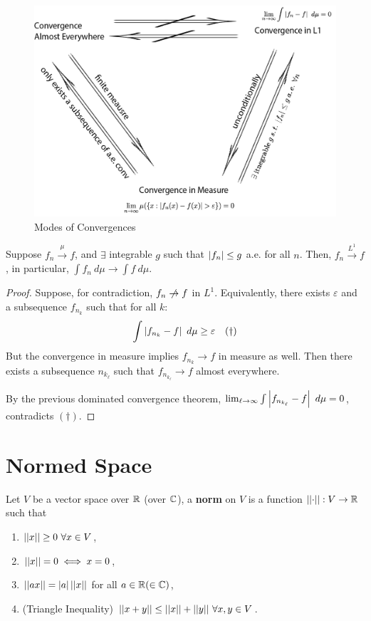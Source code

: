 \documentclass[11pt]{article}
\begin{document}
	\begin{figure}[H]
		\caption{Modes of Convergences}
		\medbreak
		\centering
		\includegraphics[width=0.7\linewidth]{mode_of_convergence.png}
	\end{figure}
	
	\begin{proposition}
		Suppose $f_n \overset{\mu}{\to} f$, and $\exists$ integrable $g$ such that $\left \vert {f_n} \right \vert \leq g$ a.e. for all $n$. Then, $f_n \overset{L^1}{\to} f$, in particular, $\int f_n\ d\mu \to \int f\ d\mu$.
		\begin{proof}
			Suppose, for contradiction, $f_n \centernot \to f$ in $L^1$. Equivalently, there exists $\varepsilon$ and a subsequence $f_{n_k}$ such that for all $k$:
			\begin{align}
				\int \left \vert {f_{n_k} - f} \right \vert\ d\mu \geq \varepsilon \quad (\dagger)
			\end{align}
			But the convergence in measure implies $f_{n_k} \to f$ in measure as well. Then there exists a subsequence $n_{k_\ell}$ such that $f_{n_{k_\ell}} \to f$ almost everywhere.
			
			By the previous dominated convergence theorem, $\lim_{\ell \to \infty} \int \left \vert {f_{n_{k_\ell}} - f} \right \vert\ d\mu = 0$, contradicts $(\dagger)$.
		\end{proof}
	\end{proposition}
	
	\section{Normed Space}
	\begin{definition}
		Let $V$ be a vector space over $\mathbb{R}$ (over $\mathbb{C}$), a \textbf{norm} on $V$ is a function $\vert \vert {\cdot} \vert \vert: V \to \mathbb{R}$ such that
		\begin{enumerate}
			\item $\vert \vert {x} \vert \vert \geq 0\ \forall x \in V$,
			\item $\vert \vert {x} \vert \vert = 0 \iff x = 0$,
			\item $\vert \vert {a x} \vert \vert = \left \vert {a} \right \vert \vert \vert {x} \vert \vert$ for all $a \in \mathbb{R}(\in \mathbb{C})$,
			\item (Triangle Inequality) $\vert \vert {x + y} \vert \vert \leq \vert \vert {x} \vert \vert + \vert \vert {y} \vert \vert\ \forall x, y \in V$.
		\end{enumerate}
	\end{definition}
	
\end{document}
